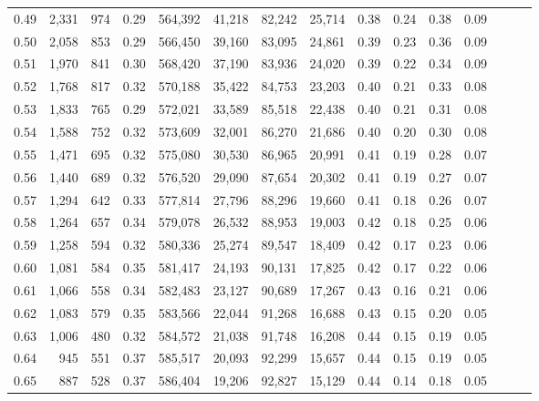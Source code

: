 \begin{tabular}{rrrrrrrrrrrrrrr}
0.49 &   2,331 &    974 &  0.29 &  564,392 &   41,218 &   82,242 &   25,714 &  0.38 &  0.24 &  0.38 &      0.09 \\
0.50 &   2,058 &    853 &  0.29 &  566,450 &   39,160 &   83,095 &   24,861 &  0.39 &  0.23 &  0.36 &      0.09 \\
0.51 &   1,970 &    841 &  0.30 &  568,420 &   37,190 &   83,936 &   24,020 &  0.39 &  0.22 &  0.34 &      0.09 \\
0.52 &   1,768 &    817 &  0.32 &  570,188 &   35,422 &   84,753 &   23,203 &  0.40 &  0.21 &  0.33 &      0.08 \\
0.53 &   1,833 &    765 &  0.29 &  572,021 &   33,589 &   85,518 &   22,438 &  0.40 &  0.21 &  0.31 &      0.08 \\
0.54 &   1,588 &    752 &  0.32 &  573,609 &   32,001 &   86,270 &   21,686 &  0.40 &  0.20 &  0.30 &      0.08 \\
0.55 &   1,471 &    695 &  0.32 &  575,080 &   30,530 &   86,965 &   20,991 &  0.41 &  0.19 &  0.28 &      0.07 \\
0.56 &   1,440 &    689 &  0.32 &  576,520 &   29,090 &   87,654 &   20,302 &  0.41 &  0.19 &  0.27 &      0.07 \\
0.57 &   1,294 &    642 &  0.33 &  577,814 &   27,796 &   88,296 &   19,660 &  0.41 &  0.18 &  0.26 &      0.07 \\
0.58 &   1,264 &    657 &  0.34 &  579,078 &   26,532 &   88,953 &   19,003 &  0.42 &  0.18 &  0.25 &      0.06 \\
0.59 &   1,258 &    594 &  0.32 &  580,336 &   25,274 &   89,547 &   18,409 &  0.42 &  0.17 &  0.23 &      0.06 \\
0.60 &   1,081 &    584 &  0.35 &  581,417 &   24,193 &   90,131 &   17,825 &  0.42 &  0.17 &  0.22 &      0.06 \\
0.61 &   1,066 &    558 &  0.34 &  582,483 &   23,127 &   90,689 &   17,267 &  0.43 &  0.16 &  0.21 &      0.06 \\
0.62 &   1,083 &    579 &  0.35 &  583,566 &   22,044 &   91,268 &   16,688 &  0.43 &  0.15 &  0.20 &      0.05 \\
0.63 &   1,006 &    480 &  0.32 &  584,572 &   21,038 &   91,748 &   16,208 &  0.44 &  0.15 &  0.19 &      0.05 \\
0.64 &     945 &    551 &  0.37 &  585,517 &   20,093 &   92,299 &   15,657 &  0.44 &  0.15 &  0.19 &      0.05 \\
0.65 &     887 &    528 &  0.37 &  586,404 &   19,206 &   92,827 &   15,129 &  0.44 &  0.14 &  0.18 &      0.05 \\

\end{tabular}
